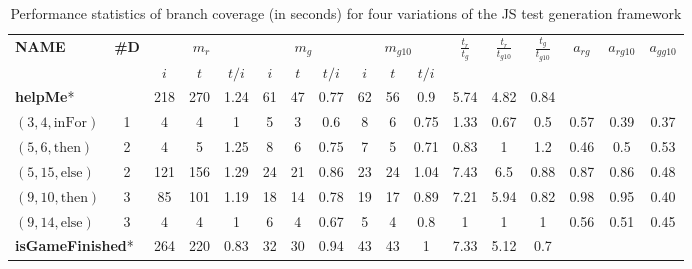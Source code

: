 \documentclass[sigconf]{acmart}
\newcommand{\thenBr}{\text{then}}
\newcommand{\elseBr}{\text{else}}
\newcommand{\inFor}{\text{inFor}}
\begin{document}
\setlength\tabcolsep{0.8pt}
\begin{table}[!t]
  \caption{Performance statistics of branch coverage (in seconds) for four variations of the JS test generation framework}
  \label{tbl.stats}
    \scriptsize
    \begin{tabular}{lc|ccc|ccc|ccc|ccc|ccc}
      \toprule
      \multirow{2}{*}{\textbf{NAME}} & \multirow{2}{*}{\textbf{\#D}}         &  \multicolumn{3}{c|}{$m_r$} & \multicolumn{3}{c|}{$m_g$} & \multicolumn{3}{c|}{$m_{g10}$} & \multirow{2}{*}{$\frac{t_r}{t_g}$} &  \multirow{2}{*}{$\frac{t_r}{t_{g10}}$} & \multirow{2}{*}{$\frac{t_g}{t_{g10}}$}   & \multirow{2}{*}{$a_{rg}$} &  \multirow{2}{*}{$a_{rg10}$} & \multirow{2}{*}{$a_{gg10}$} \\
      \cline{3-11}
            &                & $i$      & $t$  & $t/i$     & $i$& $t$&$t/i$             &$i$ &$t$ &$t/i$               &      &       &        &      &       &      \\
      \toprule
    \multicolumn{2}{l|}{\textbf{helpMe}*}     
                                 & 218      & 270  & 1.24      & 61 & 47 & 0.77             & 62 & 56 & 0.9                & 5.74 & 4.82  & 0.84   &      &      &       \\
    $(3,4,\inFor)$    & 1        & 4        & 4    & 1         & 5  & 3  & 0.6              & 8  & 6  & 0.75               & 1.33 & 0.67  & 0.5    & 0.57 & 0.39 & 0.37  \\
    $(5,6,\thenBr)$   & 2        & 4        & 5    & 1.25      & 8  & 6  & 0.75             & 7  & 5  & 0.71               & 0.83 & 1     & 1.2    & 0.46 & 0.5  & 0.53  \\
    $(5,15,\elseBr)$  & 2        & 121      & 156  & 1.29      & 24 & 21 & 0.86             & 23 & 24 & 1.04               & 7.43 & 6.5   & 0.88   & 0.87 & 0.86 & 0.48  \\
    $(9,10,\thenBr)$  & 3        & 85       & 101  & 1.19      & 18 & 14 & 0.78             & 19 & 17 & 0.89               & 7.21 & 5.94  & 0.82   & 0.98 & 0.95 & 0.40  \\
    $(9,14,\elseBr)$  & 3        & 4        & 4    & 1         & 6  & 4  & 0.67             & 5  & 4  & 0.8                & 1    & 1     & 1      & 0.56 & 0.51 & 0.45  \\
    \hline                                                                                                          
\multicolumn{2}{l|}{\textbf{isGameFinished}*} 
                                 & 264      & 220  & 0.83      & 32 & 30 & 0.94             & 43 & 43 & 1                  & 7.33 & 5.12  & 0.7    &      &      &        \\

\end{tabular}
\end{table}
\end{document}
